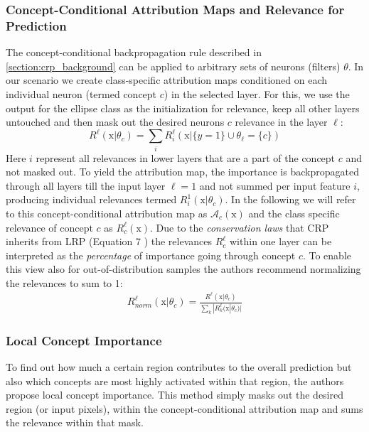 \subsubsection{Concept-Conditional Attribution Maps and Relevance for Prediction}
The concept-conditional backpropagation rule described in \cref{section:crp_background} can be applied to arbitrary sets of neurons (filters) $\theta$. In our scenario we create class-specific attribution maps conditioned on each individual neuron (termed concept $c$) in the selected layer. For this, we use the output for the ellipse class as the initialization for relevance, keep all other layers untouched and then mask out the desired neurons $c$ relevance in the layer $\ell$: 
\begin{equation}
    R^{\ell}(\mathrm{x} |\theta_{c}) = \sum_{i} R_i^{\ell}(\mathrm{x} |\{y=1\} \cup \theta_{\ell} = \{c\})
\end{equation}
Here $i$ represent all relevances in lower layers that are a part of the concept $c$ and not masked out. 
To yield the attribution map, the importance is backpropagated through all layers till the input layer $\ell = 1$ and not summed per input feature $i$, producing individual relevances  termed $R_{i}^{1}(\mathrm{x} |\theta_{c})$. In the following we will refer to this concept-conditional attribution map as $\mathcal{A}_c(\mathrm{x})$ and the class specific relevance of concept $c$ as $R_c^{\ell}(\mathrm{x})$. Due to the \textit{conservation laws} that CRP inherits from LRP (Equation 7 \cite{Achtibat2022}) the relevances $R_c^{\ell}$ within one layer can be interpreted as the \textit{percentage} of importance going through concept $c$. To enable this view also for out-of-distribution samples the authors recommend normalizing the relevances to sum to 1:
\begin{align}
    R^{\ell}_{norm}(\mathrm{x} |\theta_{c}) = \frac{R^{\ell}(\mathrm{x} |\theta_{c}) }{\sum_k |R_k^{\ell}(\mathrm{x} |\theta_{c})|}
\end{align}

\subsubsection{Local Concept Importance}
To find out how much a certain region contributes to the overall prediction but also which concepts are most highly activated within that region, the authors propose local concept importance. 
This method simply masks out the desired region (or input pixels), within the concept-conditional attribution map and sums the relevance within that mask. 

